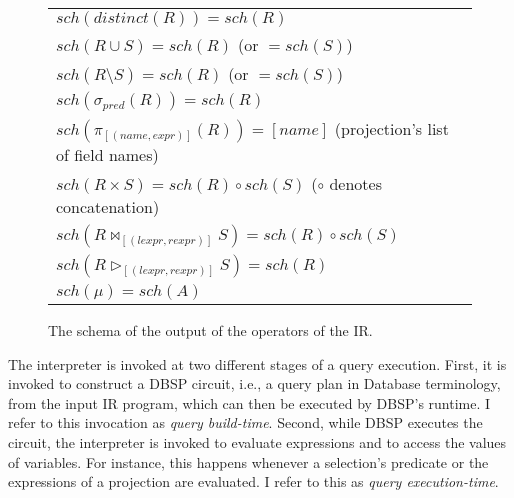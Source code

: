 \begin{figure}[htpb]
	\centering
	\begin{tabular}{@{}l@{}}
		\toprule
		\(\mathit{sch}(\mathit{distinct}(R)) = \mathit{sch}(R)\)                                                   \\
		\(\mathit{sch}(R \cup S) = \mathit{sch}(R)\) (or \(= \mathit{sch}(S)\))                                    \\
		\(\mathit{sch}(R \setminus S) = \mathit{sch}(R)\) (or \(= \mathit{sch}(S)\))                               \\
		\(\mathit{sch}(\sigma_{\mathit{pred}}(R)) = \mathit{sch}(R)\)                                              \\
		\(\mathit{sch}(\pi_{[(\mathit{name},\mathit{expr})]}(R)) = [name]\) (projection's list of field names)     \\
		\(\mathit{sch}(R \times S) = \mathit{sch}(R) \circ \mathit{sch}(S)\) (\(\circ\) denotes concatenation)     \\
		\(\mathit{sch}(R \bowtie_{[(\mathit{lexpr}, \mathit{rexpr})]} S) = \mathit{sch}(R) \circ \mathit{sch}(S)\) \\
		\(\mathit{sch}(R \triangleright_{[(\mathit{lexpr}, \mathit{rexpr})]} S) = \mathit{sch}(R) \)               \\
		\(\mathit{sch}(\mu) = \mathit{sch}(A)\)                                                                    \\
		\bottomrule
	\end{tabular}
	\caption{The schema of the output of the operators of the \ac{IR}.}\label{tab:ir-schema-operators}
\end{figure}

The interpreter is invoked at two different stages of a query execution.
First, it is invoked to construct a DBSP circuit, i.e., a query plan in
Database terminology, from the input \ac{IR} program, which can then be
executed by DBSP's runtime. I refer to this invocation as \emph{query build-time}.
Second, while DBSP executes the circuit, the interpreter is invoked to
evaluate expressions and to access the values of variables. For instance,
this happens whenever a selection's predicate or the expressions of a projection
are evaluated. I refer to this as \emph{query execution-time}.



